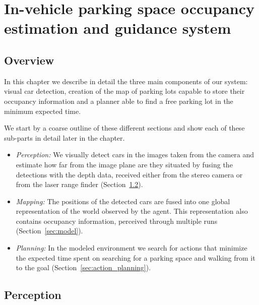 
\newcommand\Bx{x}
\newcommand\Bm{m}
\def\v{\vm{v}}
\newcommand\vm[1]{\bm{\mathrm{#1}}}
\renewcommand{\v}{{\mbox{a}^i}}
\newcommand{\z}{z_{t}}
\newcommand{\y}{z_{1:t-1}}

\chapter{In-vehicle parking space occupancy estimation and guidance system}
\label{cha:our_approach}

\section{Overview} %
\label{sec:overview}

In this chapter we describe in detail the three main components of our system:
visual car detection, creation of the map of parking lots capable to store
their occupancy information and a planner able to find a free parking lot in
the minimum expected time.

We start by a coarse outline of these different sections and show each of
these sub-parts in detail later in the chapter.

\begin{itemize}

\item \emph{Perception:}  We visually detect cars in the images taken from the
camera and estimate how far from the image plane are they situated by fusing
the detections with the depth data, received either from the stereo camera or
from the laser range finder (Section~\ref{sec:perception}).

\item \emph{Mapping:}  The positions of the detected cars are fused into one
global representation of the world observed by the agent. This representation
also contains occupancy information, perceived through multiple runs
(Section~\ref{sec:model}).

\item \emph{Planning:}  In the modeled environment we search for actions that
minimize the expected time spent on searching for a parking space and walking
from it to the goal (Section~\ref{sec:action_planning}).

\end{itemize}


\section{Perception} %
\label{sec:perception}

